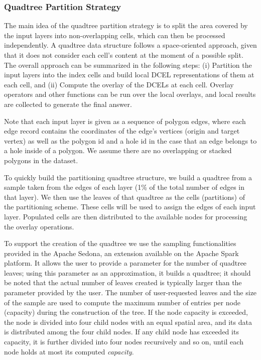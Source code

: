 \subsubsection{Quadtree Partition Strategy}\label{sec:strategy}
The main idea of the quadtree partition strategy is to split the area covered by the input layers into non-overlapping cells, which can then be processed independently. 
A quadtree data structure follows a space-oriented approach, given that it does not consider each cell's content at the moment of a possible split. 
The overall approach can be summarized in the following steps: (i) Partition the input layers into the index cells and build local DCEL representations of them at each cell, and (ii) Compute the overlay of the DCELs at each cell. Overlay operators and other functions can be run over the local overlays, and local results are collected to generate the final answer.  

Note that each input layer is given as a sequence of polygon edges, where each edge record contains the coordinates of the edge's vertices (origin and target vertex) as well as the polygon id and a hole id in the case that an edge belongs to a hole inside of a polygon. We assume there are no overlapping or stacked polygons in the dataset. 

To quickly build the partitioning quadtree structure, we build a quadtree from a sample taken from the edges of each layer (1\% of the total number of edges in that layer). We then use the leaves of that quadtree as the cells (partitions) of the partitioning scheme. These cells will be used to assign the edges of each input layer. Populated cells are then distributed to the available nodes for processing the overlay operations. 

To support the creation of the quadtree we use the sampling functionalities provided in the Apache Sedona, an extension available on the Apache Spark platform. It allows the user to provide a parameter for the number of quadtree leaves; using this parameter as an approximation, it builds a quadtree; it should be noted that the actual number of leaves created is typically larger than the parameter provided by the user. The number of user-requested leaves and the size of the sample are used to compute the maximum number of entries per node (capacity) during the construction of the tree.  If the node capacity is exceeded, the node is divided into four child nodes with an equal spatial area, and its data is distributed among the four child nodes.  If any child node has exceeded its capacity, it is further divided into four nodes recursively and so on, until each node holds at most its computed \textit{capacity}.

